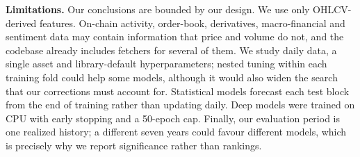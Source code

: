 \textbf{Limitations.} Our conclusions are bounded by our design. We use only OHLCV-derived features. On-chain activity, order-book, derivatives, macro-financial and sentiment data may contain information that price and volume do not, and the codebase already includes fetchers for several of them. We study daily data, a single asset and library-default hyperparameters; nested tuning within each training fold could help some models, although it would also widen the search that our corrections must account for. Statistical models forecast each test block from the end of training rather than updating daily. Deep models were trained on CPU with early stopping and a 50-epoch cap. Finally, our evaluation period is one realized history; a different seven years could favour different models, which is precisely why we report significance rather than rankings.

